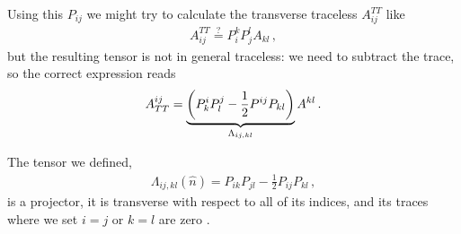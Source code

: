 \documentclass[main.tex]{subfiles}
\begin{document}
Using this \(P_{ij}\) we might try to calculate the transverse traceless \(A_{ij}^{TT}\) like 
%
\begin{align}
A^{TT}_{ij} \overset{?}{=} P^{k}_{i} P^{l}_{j} A_{kl} 
\,,
\end{align}
%
but the resulting tensor is not in general traceless: we need to subtract the trace, so the correct expression reads
%
\begin{align}
A^{ij}_{TT} = \underbrace{\qty(P^{i}_{k} P^{j}_{l} - \frac{1}{2} P^{ij} P_{kl})}_{\Lambda_{ij, kl}} A^{kl}
\,.
\end{align}

The tensor we defined, 
%
\begin{align}
\Lambda_{ij, kl} (\hat{n}) = P_{ik} P_{jl} - \frac{1}{2} P_{ij} P_{kl}
\,,
\end{align}
%
is a projector, it is transverse with respect to all of its indices, and its traces where we set \(i = j\) or \(k = l\) are zero \cite[eqs.\ 
1.36 to 1.39]{maggioreGravitationalWavesVolume2007}.
\end{document}
